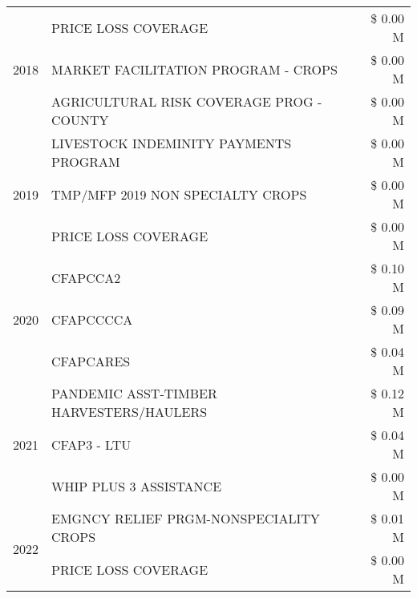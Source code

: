 \begin{tabular}{llr}
\cline{1-3}
\multirow[t]{3}{*}{2018} & PRICE LOSS COVERAGE & \$ 0.00 M \\
 & MARKET FACILITATION PROGRAM - CROPS & \$ 0.00 M \\
 & AGRICULTURAL RISK COVERAGE PROG - COUNTY & \$ 0.00 M \\
\cline{1-3}
\multirow[t]{3}{*}{2019} & LIVESTOCK INDEMINITY PAYMENTS PROGRAM & \$ 0.00 M \\
 & TMP/MFP 2019 NON SPECIALTY CROPS & \$ 0.00 M \\
 & PRICE LOSS COVERAGE & \$ 0.00 M \\
\cline{1-3}
\multirow[t]{3}{*}{2020} & CFAPCCA2 & \$ 0.10 M \\
 & CFAPCCCCA & \$ 0.09 M \\
 & CFAPCARES & \$ 0.04 M \\
\cline{1-3}
\multirow[t]{3}{*}{2021} & PANDEMIC ASST-TIMBER HARVESTERS/HAULERS & \$ 0.12 M \\
 & CFAP3 - LTU & \$ 0.04 M \\
 & WHIP PLUS 3 ASSISTANCE & \$ 0.00 M \\
\cline{1-3}
\multirow[t]{2}{*}{2022} & EMGNCY RELIEF PRGM-NONSPECIALITY CROPS & \$ 0.01 M \\
 & PRICE LOSS COVERAGE & \$ 0.00 M \\
\cline{1-3}
\bottomrule
\end{tabular}
